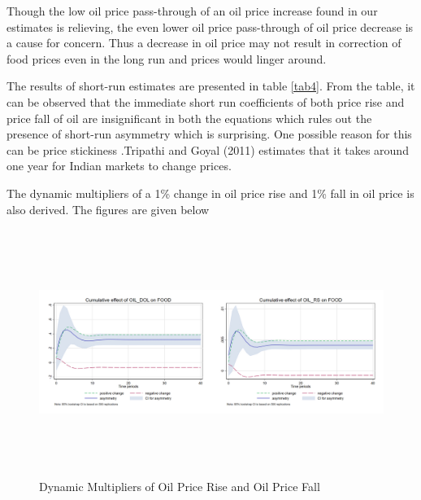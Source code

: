 \documentclass[a4paper,12pt]{article}
\begin{document}
Though the low oil price pass-through of an oil price increase found in our estimates is relieving, the even lower oil price pass-through of oil price decrease is a cause for concern. Thus a decrease in oil price may not result in correction of food prices even in the long run and prices would linger around. 

The results of short-run estimates are presented in  table \ref{tab4}.  From the table, it can be observed that the immediate short run coefficients of both price rise and price fall of oil are insignificant in both the equations which rules out the presence of short-run asymmetry which is surprising. One possible reason for this can be price stickiness .Tripathi and Goyal (2011) estimates that it takes around one year for Indian markets  to change prices. 

The dynamic multipliers of a 1\% change in oil price rise and 1\% fall in oil price is also derived. The figures are given below
\begin{figure}[h]
	\centering
	\includegraphics[width=12cm,height=8cm]{Assym_collage.jpg}
	\caption{Dynamic Multipliers of Oil Price Rise and Oil Price Fall }
\end{figure}
\end{document}
